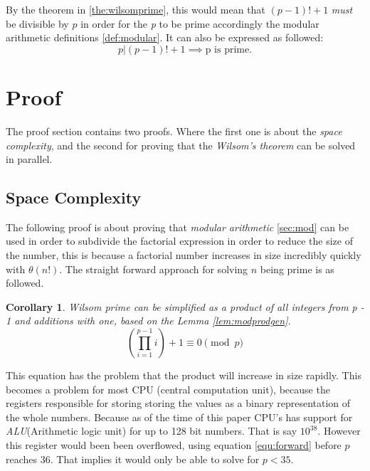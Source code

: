 \documentclass[12pt, oneside, onecolumn]{article}
\newtheorem{corollary}{Corollary}[theorem]
\begin{document}
By the theorem in \ref{the:wilsomprime}, this would mean that $(p-1)! + 1 $ \emph{must} be divisible by $p$ in order for the \emph{p} to be prime accordingly the modular arithmetic definitions \ref{def:modular}. It can also be expressed as followed:
\begin{equation}
p | (p - 1)! + 1 \implies \text{p is prime.}
\end{equation}

\section{Proof}\label{sec:proof}
The proof section contains two proofs. Where the first one is about the \emph{space complexity}, and the second for proving that the \emph{Wilsom's theorem} can be solved in parallel.

\subsection{Space Complexity}\label{pro:spacecomplexity}
The following proof is about proving that \emph{modular arithmetic} \ref{sec:mod} can be used in order to subdivide the factorial expression in order to reduce the size of the number, this is because a factorial number increases in size incredibly quickly with $\theta(n!)$. The straight forward approach for solving $n$ being prime is as followed.

\begin{corollary}{}
Wilsom prime can be simplified as a product of all integers from p - 1 and additions with one, based on the Lemma \ref{lem:modprodgen}.
\begin{equation}\label{equ:forward}
 \left( \prod_{i = 1}^{p-1} i \right) + 1 \equiv 0 \pmod p
\end{equation}

\end{corollary}


This equation has the problem that the product will increase in size rapidly. This becomes a problem for most CPU (central computation unit), because the registers responsible for storing storing the values as a binary representation of the whole numbers. Because as of the time of this paper CPU's has support for \emph{ALU}(Arithmetic logic unit) for up to 128 bit numbers. That is say $10^{38}$. However this register would been been overflowed, using equation \ref{equ:forward} before $p$ reaches $36$. That implies it would only be able to solve for $p < 35$.
\end{document}
